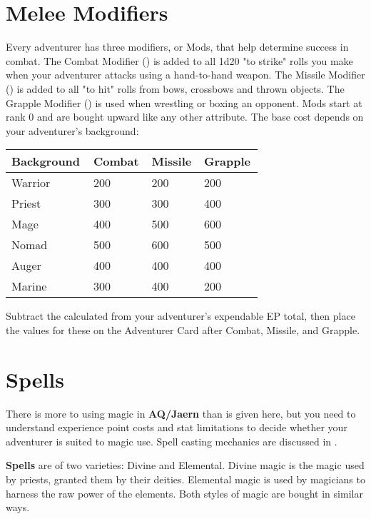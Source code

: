 \section{Melee Modifiers}
Every adventurer has three modifiers, or Mods, that help determine success in combat. The Combat Modifier (\CM) is added to all 1d20 "to strike" rolls you make when your adventurer attacks using a hand-to-hand weapon. The Missile Modifier (\MM) is added to all "to hit" rolls from bows, crossbows and thrown objects. The Grapple Modifier (\GM) is used when wrestling or boxing an opponent. Mods start at rank 0 and are bought upward like any other attribute. The base cost depends on your adventurer's background:

\begin{normbox}

\small
\begin{tabular}{@{} p{0.25\linewidth} p{0.15\linewidth} p{0.15\linewidth} p{0.15\linewidth}}
\textbf{Background} & \textbf{Combat} & \textbf{Missile} & \textbf{Grapple}\\
\midrule
Warrior & 200 & 200 & 200\\
Priest & 300 & 300 & 400\\
Mage & 400 & 500 & 600\\
Nomad & 500 & 600 & 500\\
Auger & 400 & 400 & 400\\
Marine & 300 & 400 & 200\\
\end{tabular}
\end{normbox}

Subtract the calculated \EP from your adventurer's expendable EP total, then place the values for these on the Adventurer Card after Combat, Missile, and Grapple.
\section{Spells}

There is more to using magic in \textbf{AQ/Jaern} than is given here, but you need to understand experience point costs and stat limitations to decide whether your adventurer is suited to magic use. Spell casting mechanics are discussed in .

\textbf{Spells} are of two varieties: Divine and Elemental. Divine magic is the magic used by priests, granted them by their deities. Elemental magic is used by magicians to harness the raw power of the elements. Both styles of magic are bought in similar ways.

